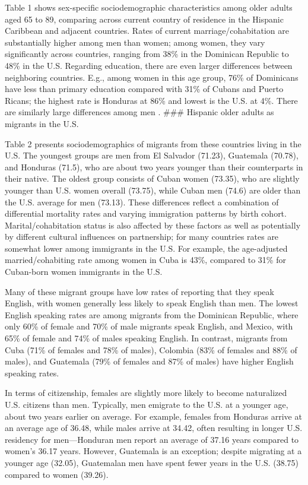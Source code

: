 \documentclass[
]{article}
\begin{document}
Table 1 shows sex-specific sociodemographic characteristics among older
adults aged 65 to 89, comparing across current country of residence in
the Hispanic Caribbean and adjacent countries. Rates of current
marriage/cohabitation are substantially higher among men than women;
among women, they vary significantly across countries, ranging from 38\%
in the Dominican Republic to 48\% in the U.S. Regarding education, there
are even larger differences between neighboring countries. E.g., among
women in this age group, 76\% of Dominicans have less than primary
education compared with 31\% of Cubans and Puerto Ricans; the highest
rate is Honduras at 86\% and lowest is the U.S. at 4\%. There are
similarly large differences among men . \#\#\# Hispanic older adults as
migrants in the U.S.

Table 2 presents sociodemographics of migrants from these countries
living in the U.S. The youngest groups are men from El Salvador (71.23),
Guatemala (70.78), and Honduras (71.5), who are about two years younger
than their counterparts in their native. The oldest group consists of
Cuban women (73.35), who are slightly younger than U.S. women overall
(73.75), while Cuban men (74.6) are older than the U.S. average for men
(73.13). These differences reflect a combination of differential
mortality rates and varying immigration patterns by birth cohort.
Marital/cohabitation status is also affected by these factors as well as
potentially by different cultural influences on partnership; for many
countries rates are somewhat lower among immigrants in the U.S. For
example, the age-adjusted married/cohabiting rate among women in Cuba is
43\%, compared to 31\% for Cuban-born women immigrants in the U.S.

Many of these migrant groups have low rates of reporting that they speak
English, with women generally less likely to speak English than men. The
lowest English speaking rates are among migrants from the Dominican
Republic, where only 60\% of female and 70\% of male migrants speak
English, and Mexico, with 65\% of female and 74\% of males speaking
English. In contrast, migrants from Cuba (71\% of females and 78\% of
males), Colombia (83\% of females and 88\% of males), and Guatemala
(79\% of females and 87\% of males) have higher English speaking rates.

In terms of citizenship, females are slightly more likely to become
naturalized U.S. citizens than men. Typically, men emigrate to the U.S.
at a younger age, about two years earlier on average. For example,
females from Honduras arrive at an average age of 36.48, while males
arrive at 34.42, often resulting in longer U.S. residency for
men---Honduran men report an average of 37.16 years compared to women's
36.17 years. However, Guatemala is an exception; despite migrating at a
younger age (32.05), Guatemalan men have spent fewer years in the U.S.
(38.75) compared to women (39.26).
\end{document}
